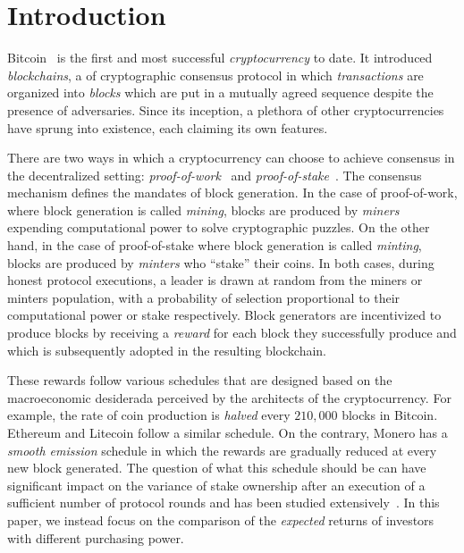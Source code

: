 
\section{Introduction}

Bitcoin~\cite{bitcoin} is the first and most successful \emph{cryptocurrency} to
date. It introduced \emph{blockchains}, a of cryptographic consensus protocol in
which \emph{transactions} are organized into \emph{blocks} which are put in a
mutually agreed sequence despite the presence of adversaries. Since its
inception, a plethora of other cryptocurrencies have sprung into existence, each
claiming its own features.

There are two ways in which a cryptocurrency can choose to achieve consensus in
the decentralized setting:
\emph{proof-of-work}~\cite{C:DwoNao92} and
\emph{proof-of-stake}~\cite{C:KRDO17}. The consensus mechanism defines the
mandates of block generation. In the case of proof-of-work, where block
generation is called \emph{mining}, blocks are produced by \emph{miners}
expending computational power to solve cryptographic puzzles. On the other hand,
in the case of proof-of-stake where block generation is called \emph{minting},
blocks are produced by \emph{minters} who ``stake'' their coins. In both cases,
during honest protocol executions, a leader is drawn at random from the
miners or minters population, with a probability of selection proportional to
their computational power or stake respectively. Block generators are
incentivized to produce blocks by receiving a \emph{reward} for each block they
successfully produce and which is subsequently adopted in the resulting
blockchain.

These rewards follow various schedules that are designed based on the
macroeconomic desiderada perceived by the architects of the cryptocurrency. For
example, the rate of coin production is \emph{halved} every $210,000$ blocks in
Bitcoin. Ethereum and Litecoin follow a similar schedule. On the contrary,
Monero has a \emph{smooth emission} schedule in which the rewards are gradually
reduced at every new block generated. The question of what this schedule should
be can have significant impact on the variance of stake ownership after an
execution of a sufficient number of protocol rounds and has been studied
extensively~\cite{equitability}. In this paper, we instead focus on the
comparison of the \emph{expected} returns of investors with different purchasing
power.


